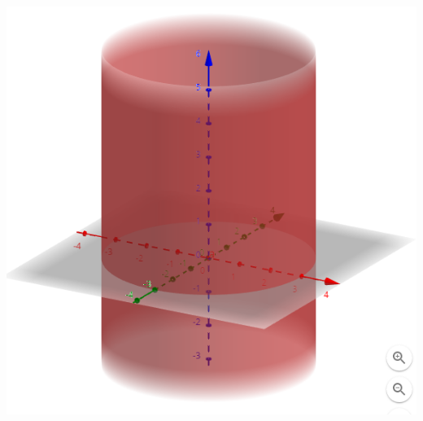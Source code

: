 \documentclass[../practica_01.tex]{subfiles}
\begin{document}
\begin{enumerate}
            \includegraphics[scale=0.4]{ej01/resources/1g.png} $ $
    \end{enumerate}
\end{document}
